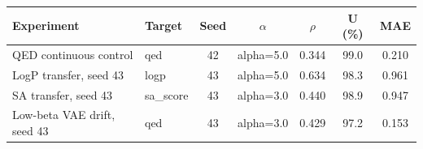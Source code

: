 \begin{tabular}{l l c c c c c}
\toprule
Experiment & Target & Seed & $\alpha$ & $\rho$ & U (\%) & MAE \\
\midrule
QED continuous control & qed & 42 & alpha=5.0 & 0.344 & 99.0 & 0.210 \\
LogP transfer, seed 43 & logp & 43 & alpha=5.0 & 0.634 & 98.3 & 0.961 \\
SA transfer, seed 43 & sa\_score & 43 & alpha=3.0 & 0.440 & 98.9 & 0.947 \\
Low-beta VAE drift, seed 43 & qed & 43 & alpha=3.0 & 0.429 & 97.2 & 0.153 \\
\bottomrule
\end{tabular}
